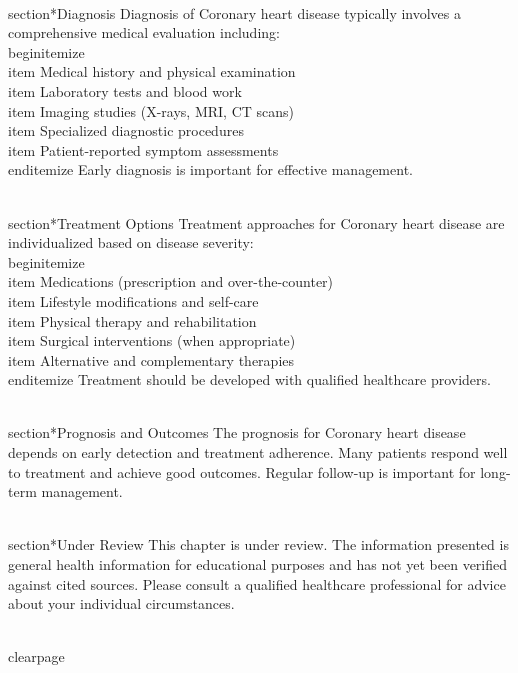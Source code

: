 \\section*{Diagnosis}
Diagnosis of Coronary heart disease typically involves a comprehensive medical evaluation including:
\\begin{itemize}
  \\item Medical history and physical examination
  \\item Laboratory tests and blood work
  \\item Imaging studies (X-rays, MRI, CT scans)
  \\item Specialized diagnostic procedures
  \\item Patient-reported symptom assessments
\\end{itemize}
Early diagnosis is important for effective management.

\\section*{Treatment Options}
Treatment approaches for Coronary heart disease are individualized based on disease severity:
\\begin{itemize}
  \\item Medications (prescription and over-the-counter)
  \\item Lifestyle modifications and self-care
  \\item Physical therapy and rehabilitation
  \\item Surgical interventions (when appropriate)
  \\item Alternative and complementary therapies
\\end{itemize}
Treatment should be developed with qualified healthcare providers.

\\section*{Prognosis and Outcomes}
The prognosis for Coronary heart disease depends on early detection and treatment adherence. Many patients respond well to treatment and achieve good outcomes. Regular follow-up is important for long-term management.

\\section*{Under Review}
This chapter is under review. The information presented is general health information for educational purposes and has not yet been verified against cited sources. Please consult a qualified healthcare professional for advice about your individual circumstances.

\\clearpage
